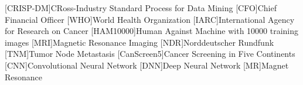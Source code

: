\begin{acronym}[CRISP-DM]
[CRISP-DM]{CRoss-Industry Standard Process for Data Mining}
[CFO]{Chief Financial Officer}
[WHO]{World Health Organization}
[IARC]{International Agency for Research on Cancer}
[HAM10000]{Human Against Machine with 10000 training images}
[MRI]{Magnetic Resonance Imaging}
[NDR]{Norddeutscher Rundfunk}
[TNM]{Tumor Node Metastasis}
[CanScreen5]{Cancer Screening in Five Continents}
[CNN]{Convolutional Neural Network}
[DNN]{Deep Neural Network}
[MR]{Magnet Resonance}
\end{acronym}